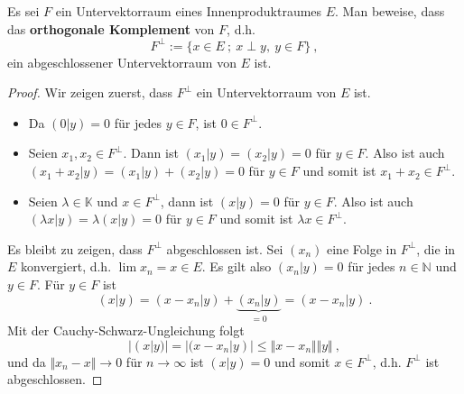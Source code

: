 \begin{aufgabe}
	Es sei $F$ ein Untervektorraum eines Innenproduktraumes $E$. Man beweise, dass das 
	\textbf{orthogonale Komplement} von $F$, d.h.
	\[
		F^\perp := \{ x \in E \ ; \ x \perp y, \ y \in F \} \ ,
	\]
	ein abgeschlossener Untervektorraum von $E$ ist.
\end{aufgabe}
\begin{proof}
	Wir zeigen zuerst, dass $F^\perp$ ein Untervektorraum von $E$ ist.
	\begin{itemize}
		\item Da $(0 | y) = 0$ für jedes $y \in F$, ist $0 \in F^\perp$.
		\item Seien $x_1, x_2 \in F^\perp$. Dann ist $(x_1 | y) = (x_2 | y) = 0$ für $y \in F$.
			Also ist auch $(x_1 + x_2 | y) = (x_1 | y ) + (x_2 | y) = 0$ für $y \in F$ und somit
			ist $x_1 + x_2 \in F^\perp$.
		\item Seien $\lambda \in \mathbb K$ und $x \in F^\perp$, dann ist 
			$(x | y) = 0$ für $y \in F$. Also ist auch $(\lambda x | y) = \lambda (x | y) = 0$
			für $y \in F$ und somit ist $\lambda x \in F^\perp$.
	\end{itemize}
	Es bleibt zu zeigen, dass $F^\perp$ abgeschlossen ist. Sei $(x_n)$ eine Folge in $F^\perp$, 
	die in $E$ konvergiert, d.h. $\lim x_n = x \in E$. 
	Es gilt also $(x_n | y) = 0$ für jedes $n \in \mathbb N$ und $y \in F$.
	Für $y \in F$ ist 
	\[
		(x | y) = (x - x_n | y ) + \underbrace{ (x_n | y)}_{=0} = (x - x_n | y) \ .
	\]
	Mit der Cauchy-Schwarz-Ungleichung folgt
	\[
		| (x | y) | = | (x-x_n | y) | \leq \Vert x - x_n \Vert \Vert y \Vert \ ,
	\]
	und da $\Vert x_n - x \Vert \to 0$ für $n \to \infty$ ist $(x|y)=0$ und somit
	$x \in F^\perp$, d.h. $F^\perp$ ist abgeschlossen.
\end{proof}

